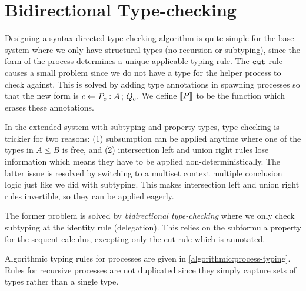 
\section{Bidirectional Type-checking}

Designing a syntax directed type checking algorithm is quite simple for the base system where we only have structural types (no recursion or subtyping), since the form of the process determines a unique applicable typing rule. The $\texttt{cut}$ rule causes a small problem since we do not have a type for the helper process to check against. This is solved by adding type annotations in spawning processes so that the new form is $c \leftarrow P_c : A \,;\, Q_c$. We define $\llbracket P\rrbracket$ to be the function which erases these annotations.

In the extended system with subtyping and property types, type-checking is trickier for two reasons: (1) subsumption can be applied anytime where one of the types in $A \le B$ is free, and (2) intersection left and union right rules lose information which means they have to be applied non-deterministically. The latter issue is resolved by switching to a multiset context multiple conclusion logic just like we did with subtyping. This makes intersection left and union right rules invertible, so they can be applied eagerly.

The former problem is solved by \emph{bidirectional type-checking} where we only check subtyping at the identity rule (delegation). This relies on the subformula property for the sequent calculus, excepting only the cut rule which is annotated. 

Algorithmic typing rules for processes are given in \cref{algorithmic:process-typing}. Rules for recursive processes are not duplicated since they simply capture sets of types rather than a single type. 

